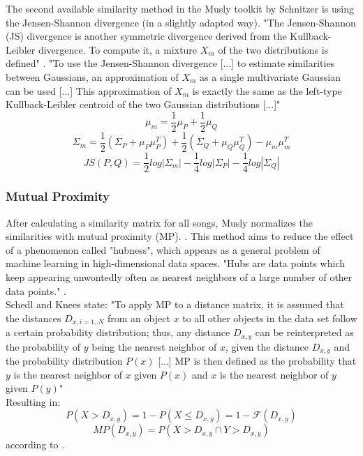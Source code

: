 The second available similarity method in the Musly toolkit by Schnitzer is using the Jensen-Shannon divergence (in a slightly adapted way). "The Jensen-Shannon (JS) divergence is another symmetric divergence derived from the Kullback-Leibler divergence. To compute it, a mixture $X_m$ of the two distributions is defined" \cite[p. 43]{schnitzer1}. "To use the Jensen-Shannon divergence [...] to estimate similarities between Gaussians, an approximation of $X_m$ as a single multivariate Gaussian can be used [...] This approximation of $X_m$ is exactly the same as the left-type Kullback-Leibler centroid of the two Gaussian distributions [...]" \cite[p. 45]{schnitzer1} 
\begin{equation} \label{eq:jsl1}
\mu_m = \frac{1}{2} \mu_P + \frac{1}{2} \mu_Q
\end{equation}
\begin{equation} \label{eq:jsl2}
\Sigma_m = \frac{1}{2} (\Sigma_P + \mu_P\mu_P^T) + \frac{1}{2} (\Sigma_Q + \mu_Q\mu_Q^T) - \mu_m\mu_m^T
\end{equation}
\begin{equation} \label{eq:jsl3}
JS(P, Q) = \frac{1}{2} log|\Sigma_m| - \frac{1}{4} log |\Sigma_P| - \frac{1}{4} log |\Sigma_Q|
\end{equation}

\subsubsection{Mutual Proximity}\label{mprox}
After calculating a similarity matrix for all songs, Musly normalizes the similarities with mutual proximity (MP). \cite{musly2}. This method aims to reduce the effect of a phenomenon called "hubness", which appears as a general problem of machine learning in high-dimensional data spaces. "Hubs are data points which keep appearing unwontedly often as nearest neighbors of a large number of other data points." \cite[p. 66]{schnitzer1}.\\
Schedl and Knees state: "To apply MP to a distance matrix, it is assumed that the distances $D_{x,i = 1..N}$ from an object $x$ to all other objects in the data set follow a certain probability distribution; thus, any distance $D_{x,y}$ can be reinterpreted as the probability of $y$ being the nearest neighbor of $x$, given the distance $D_{x,y}$ and the probability distribution $P(x)$ [...] MP is then defined as the probability that $y$ is the nearest neighbor of $x$ given $P(x)$ and $x$ is the nearest neighbor of $y$ given $P(y)$" \cite[p. 80]{knees1}\\
Resulting in: 
\begin{equation} \label{eq:mp1}
P(X > D_{x,y}) = 1 - P(X \leq D_{x,y}) = 1 - \mathscr{F}(D_{x,y}) 
\end{equation}
\begin{equation} \label{eq:mp2}
MP(D_{x,y}) = P(X > D_{x,y} \cap Y > D_{x,y})
\end{equation}
according to \cite[p. 80]{knees1}.\\

